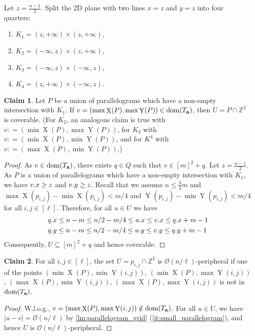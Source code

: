 \documentclass[11pt, letterpaper]{article}
\theoremstyle{plain}
\theoremstyle{definition}
\newtheorem{claim}{Claim}
\theoremstyle{remark}
\newcommand{\Z}{\mathbb{Z}}
\renewcommand{\O}{\mathcal{O}}
\DeclareMathOperator*{\X}{X}
\DeclareMathOperator*{\Y}{Y}
\begin{document}
Let $z = \frac{n - 1}{2}$. Split the 2D plane with two lines $x = z$ and $y = z$ into four quarters:
\begin{enumerate}[1)]
	\item $K_1 = (z, +\infty) \times (z, +\infty)$,
	\item $K_2 = (-\infty, z) \times (z, +\infty)$,
	\item $K_3 = (-\infty, z) \times (-\infty, z)$,
	\item $K_4 = (z, +\infty) \times (-\infty, z)$.
\end{enumerate}

\newcommand{\I}{\mathcal{I}}
\newcommand{\G}{\mathcal{G}}
\newcommand{\C}{\mathcal{C}}

\begin{claim}\label{coverable}
Let $P$ be a union of parallelograms which have a non-empty intersection with $K_1$. If $v = (\max \X(P), \max \Y(P)) \in \d{\Ta}$, then $U = P \cap \Z^2$ is coverable. (For $K_2$, an analogous claim is true with $v: = (\min \X(P), \max \Y(P))$, for $K_3$ with $v : = (\min \X(P), \min \Y(P))$, and for $K^4$ with $v : = (\max \X(P), \min \Y(P))$.)
\end{claim}
\begin{proof}
As $v \in \operatorname*{dom}(T_\mathbf{a})$, there exists $q \in Q$ such that $v \in [m]^2 + q$. Let $z = \frac{n - 1}{2}$. As $P$ is a union of parallelograms which have a non-empty intersection with $K_1$, we have $v.x \ge z$ and $v.y \ge z$. Recall that we assume $n \le \frac{3}{2} m$ and $\max \X(p_{i, j}) - \min \X(p_{i, j}) < m / 4$ and $\Y(p_{i, j}) - \min \Y(p_{i, j}) < m / 4$ for all $i, j \in [\ell]$. Therefore, for all $u \in U$ we have
\begin{align}
&q.x \le n-m \le n/2-m/4 \le u.x \le v.x \le q.x + m-1\\
&q.y \le n-m \le n/2-m/4 \le u.y \le v.y \le q.y + m-1 
\end{align}
\noindent Consequently, $U \subseteq [m]^2+q$ and hence coverable.
\end{proof}

\begin{claim}\label{peripheral}
For all $i,j \in [\ell]$, the set $U = p_{i,j} \cap \Z^2$ is $\O(n / \ell)$-peripheral if one of the points $(\min \X(P), \min \Y(i,j))$, $(\min \X(P), \max \Y(i,j))$, $(\max \X(P), \min \Y(i,j))$, $(\max \X(P), \max \Y(i,j))$ is not in $\operatorname*{dom}(T_\mathbf{a})$.
\end{claim}
\begin{proof}
W.l.o.g., $v = (\max \X(P), \max \Y(i,j)) \notin \d{\Ta}$. For all $u \in U$, we have $|u-v| = \O(n / \ell)$ by \cref{lm:parallelogram_grid} (\ref{it:small_parallelogram}), and hence $U$ is $\O(n / \ell)$-peripheral.
\end{proof}
\end{document}
